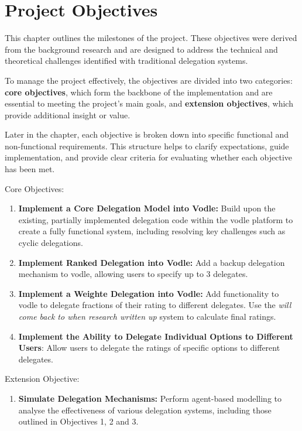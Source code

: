 \chapter{Project Objectives}
\label{ch:project_objectives}
This chapter outlines the milestones of the project. These objectives were derived from the background research and are designed to address the technical and theoretical challenges identified with traditional delegation systems.

To manage the project effectively, the objectives are divided into two categories: \textbf{core objectives}, which form the backbone of the implementation and are essential to meeting the project's main goals, and \textbf{extension objectives}, which provide additional insight or value. 

Later in the chapter, each objective is broken down into specific functional and non-functional requirements. This structure helps to clarify expectations, guide implementation, and provide clear criteria for evaluating whether each objective has been met.

Core Objectives:
\begin{enumerate}
    \item \textbf{Implement a Core Delegation Model into Vodle: } Build upon the existing, partially implemented delegation code within the vodle platform to create a fully functional system, including resolving key challenges such as cyclic delegations.

    \item \textbf{Implement Ranked Delegation into Vodle: } Add a backup delegation mechanism to vodle, allowing users to specify up to 3 delegates.

    \item \textbf{Implement a Weighte Delegation into Vodle: } Add functionality to vodle to delegate fractions of their rating to different delegates. Use the \textit{will come back to when research written up} system to calculate final ratings.

    \item \textbf{Implement the Ability to Delegate Individual Options to Different Users}: Allow users to delegate the ratings of specific options to different delegates.
\end{enumerate}

Extension Objective:
\begin{enumerate}
    \item \textbf{Simulate Delegation Mechanisms: } Perform agent-based modelling to analyse the effectiveness of various delegation systems, including those outlined in Objectives 1, 2 and 3.
\end{enumerate}

